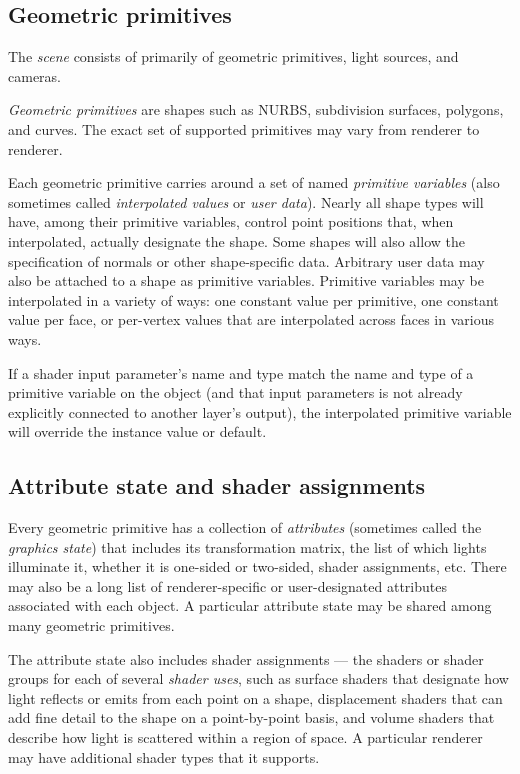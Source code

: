 \documentclass[11pt,letterpaper]{book}
\begin{document}
\subsection*{Geometric primitives}

The \emph{scene} consists of primarily of geometric primitives,
light sources, and cameras.

\emph{Geometric primitives} are shapes such as NURBS, subdivision surfaces,
polygons, and curves.  The exact set of supported primitives may vary
from renderer to renderer.

Each geometric primitive carries around a set of named \emph{primitive
variables} (also sometimes called \emph{interpolated values} or
\emph{user data}).  Nearly all shape types will have, among their primitive
variables, control point positions that, when interpolated, actually
designate the shape.  Some shapes will also allow the specification of
normals or other shape-specific data.  Arbitrary user data may also be
attached to a shape as primitive variables.  Primitive variables may be
interpolated in a variety of ways: one constant value per primitive, one
constant value per face, or per-vertex values that are interpolated
across faces in various ways.

If a shader input parameter's name and type match the name and type
of a primitive variable on the object (and that input parameters is
not already explicitly connected to another layer's output), the
interpolated primitive variable will override the instance value or
default.


\subsection*{Attribute state and shader assignments}

Every geometric primitive has a collection of \emph{attributes} (sometimes
called the \emph{graphics state}) that includes its transformation
matrix, the list of which lights illuminate it, whether it is one-sided
or two-sided, shader assignments, etc.  There may also be a long list of
renderer-specific or user-designated attributes associated with each
object.  A particular attribute state may be shared among many geometric
primitives.

The attribute state also includes shader assignments --- the shaders or
shader groups for each of several \emph{shader uses}, such as surface
shaders that designate how light reflects or emits from each point on a shape,
displacement shaders that can add fine detail to the shape on a
point-by-point basis, and volume shaders that describe how light is
scattered within a region of space.  A particular renderer may have
additional shader types that it supports.
\end{document}
